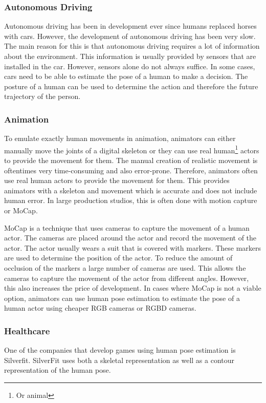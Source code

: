 \subsubsection{Autonomous Driving}

Autonomous driving has been in development ever since humans replaced horses with cars. However, the development of autonomous driving has been very slow. The main reason for this is that autonomous driving requires a lot of information about the environment. This information is usually provided by sensors that are installed in the car. However, sensors alone do not always suffice. In some cases, cars need to be able to estimate the pose of a human to make a decision. The posture of a human can be used to determine the action and therefore the future trajectory of the person. 

\subsubsection{Animation}

To emulate exactly human movements in animation, animators can either manually move the joints of a digital skeleton or they can use real human\footnote{Or animal} actors to provide the movement for them. The manual creation of realistic movement is oftentimes very time-consuming and also error-prone. Therefore, animators often use real human actors to provide the movement for them. This provides animators with a skeleton and movement which is accurate and does not include human error. In large production studios, this is often done with motion capture or MoCap. 

MoCap is a technique that uses cameras to capture the movement of a human actor. The cameras are placed around the actor and record the movement of the actor. The actor usually wears a suit that is covered with markers. These markers are used to determine the position of the actor. To reduce the amount of occlusion of the markers a large number of cameras are used. This allows the cameras to capture the movement of the actor from different angles. However, this also increases the price of development. In cases where MoCap is not a viable option, animators can use human pose estimation to estimate the pose of a human actor using cheaper RGB cameras or RGBD cameras.

\subsubsection{Healthcare}

One of the companies that develop games using human pose estimation is Silverfit. SilverFit uses both a skeletal representation as well as a contour representation of the human pose. 